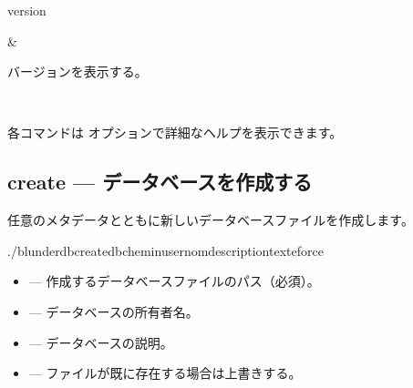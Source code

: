 \documentclass[letterpaper,10pt,dvipdfmx]{sphinxmanual}
\begin{document}
\begin{savenotes}
\begin{tabular}[t]{}
\sphinxhline\begin{varwidth}[t]{}
\sphinxAtStartPar
version
\sphinxbeforeendvarwidth
\end{varwidth}%
&\begin{varwidth}[t]{}
\sphinxAtStartPar
バージョンを表示する。
\sphinxbeforeendvarwidth
\end{varwidth}%
\\
\sphinxbottomrule
\end{tabular}
\sphinxtableafterendhook\par
\sphinxattableend\end{savenotes}

\sphinxAtStartPar
各コマンドは  オプションで詳細なヘルプを表示できます。


\subsection{create — データベースを作成する}
\label{\detokenize{cli:create-creer-une-base-de-donnees}}
\sphinxAtStartPar
任意のメタデータとともに新しいデータベースファイルを作成します。

\begin{sphinxVerbatim}[commandchars=\\\{\}]
./blunderdbcreate\PYGZhy{}\PYGZhy{}db\PYGZlt{}chemin\PYGZgt{}\PYG{o}{[}\PYGZhy{}\PYGZhy{}user\PYGZlt{}nom\PYGZgt{}\PYG{o}{]}\PYG{o}{[}\PYGZhy{}\PYGZhy{}description\PYGZlt{}texte\PYGZgt{}\PYG{o}{]}\PYG{o}{[}\PYGZhy{}\PYGZhy{}force\PYG{o}{]}
\end{sphinxVerbatim}

\sphinxAtStartPar
{}
\begin{itemize}
\item {} 
\sphinxAtStartPar
{} — 作成するデータベースファイルのパス（必須）。

\item {} 
\sphinxAtStartPar
{} — データベースの所有者名。

\item {} 
\sphinxAtStartPar
{} — データベースの説明。

\item {} 
\sphinxAtStartPar
{} — ファイルが既に存在する場合は上書きする。

\end{itemize}
\end{document}
